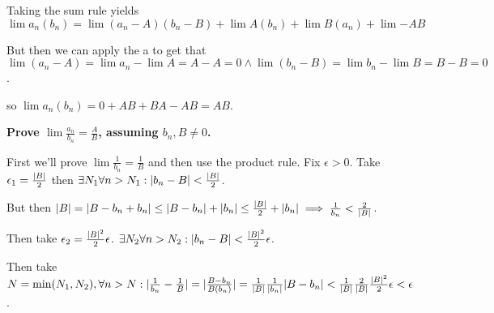 \documentclass[10pt,a4paper]{article}
\DeclarePairedDelimiter{\abs}{\lvert}{\rvert}
\begin{document}
\begin{enumerate}
        Taking the sum rule yields $\lim a_n(b_n) = \lim (a_n -A)(b_n -B) + \lim A(b_n) + \lim B(a_n) + \lim {-AB}$
        
        But then we can apply the a to get that $\lim (a_n -A) = \lim a_n - \lim A = A -A = 0 \land \lim (b_n -B) = \lim b_n - \lim B = B -B = 0 $.

        so $\lim a_n(b_n) = 0  + AB  + BA - AB = AB $.

        \textbf{Prove $\lim \frac{a_n}{b_n} = \frac{A}{B}$, assuming $b_n, B \neq 0$. }

        First we'll prove $\lim \frac{1}{b_n} = \frac{1}{B}$ and then use the product rule. Fix $\epsilon > 0$. Take $\epsilon_1 = \frac{\abs{B}}{2}$ then $\exists N_1 \forall n > N_1 : \abs{b_n - B} < \frac{\abs{B}}{2}$.

        But then $\abs{B} = \abs{B - b_n +b_n} \leq \abs{B-b_n} + \abs{b_n} \leq \frac{\abs{B}}{2} + \abs{b_n} \implies \frac{1}{b_n} < \frac{2}{\abs{B}}$.

        Then take $\epsilon_2 = \frac{\abs{B}^2}{2} \epsilon$. $\exists N_2 \forall n > N_2: \abs{b_n - B} < \frac{\abs{B}^2}{2}\epsilon$.

        Then take $N = \min(N_1, N_2), \forall n > N: \abs{\frac{1}{b_n} - \frac{1}{B}} = \abs{\frac{B - b_n}{B(b_n)}} = \frac{1}{\abs{B}}\frac{1}{\abs{b_n}}\abs{B-b_n} < \frac{1}{\abs{B}} \frac{2}{\abs{B}} \frac{\abs{B}^2}{2}\epsilon < \epsilon$.

\end{enumerate}
\end{document}

